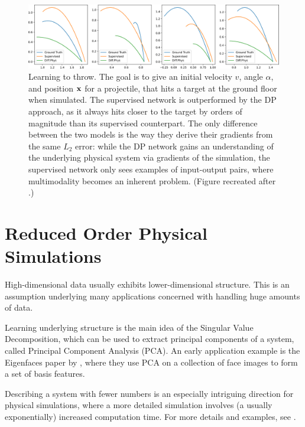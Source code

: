 \begin{figure}
  \centering
  \includegraphics[width=\textwidth]{figures/throwing_results}
  \caption{Learning to throw. The goal is to give an initial velocity $v$, angle
    $\alpha$, and position $\vb{x}$ for a projectile, that hits a target at the
    ground floor when simulated.  The supervised network is outperformed by the
    \ac{DP} approach, as it always hits closer to the target by orders of
    magnitude than its supervised counterpart.  The only difference between the
    two models is the way they derive their gradients from the same $L_2$
    error: while the \ac{DP} network gains an understanding of the underlying
    physical system via gradients of the simulation, the supervised network only
    sees examples of input-output pairs, where multimodality becomes an inherent
    problem.  (Figure recreated after \citet{LearnToThrow}.)
  }
    \label{fig:learning-to-throw}
\end{figure}

\section{Reduced Order Physical Simulations}

High-dimensional data usually exhibits lower-dimensional
structure. This is an assumption underlying many applications concerned with
handling huge amounts of data.

Learning underlying structure is the main idea of the Singular
Value Decomposition, which can be used to extract principal components of
a system, called Principal Component Analysis (PCA). An early application
example is the Eigenfaces paper by \cite{eigenface1987}, where they use
PCA on a collection of face images to form a set of basis features.

Describing a system with fewer numbers is an especially intriguing direction for
physical simulations, where a more detailed simulation involves (a usually
exponentially) increased computation time. For more details and examples, see
\cite{BruntonKnutz2019}.

